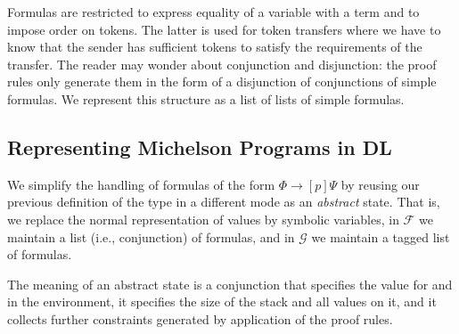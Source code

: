 Formulas are restricted to express equality of a variable with a term
and to impose order on tokens. The latter is used for token transfers
where we have to know that the sender has sufficient tokens to satisfy
the requirements of the transfer. The reader may wonder about 
conjunction and disjunction: the proof rules only generate them in the
form of a disjunction of conjunctions of simple formulas.  We
represent this structure as a list of lists of simple formulas.


\subsection{Representing Michelson Programs in DL}\label{sec:abstract-states}

We simplify the handling of formulas of the form $\Phi \to [p]\Psi$ by
reusing our previous definition of the type  in a
different mode as an \emph{abstract} state.
\AbstractAMode
That is, we replace the normal representation of values by symbolic
variables, in $\mathcal{F}$ we maintain a list (i.e., conjunction) of
formulas, and in $\mathcal{G}$ we maintain a tagged list of formulas. 

The meaning of an abstract state is a conjunction that specifies the
value for  and  in the environment, it
specifies the size of the stack and all values on it, and it collects
further constraints generated by application of the proof rules.



